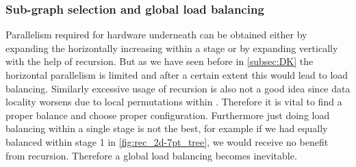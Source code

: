 \subsubsection{Sub-graph selection and global load balancing} \label{subsec:subgraph_selection}
Parallelism required for hardware underneath can be obtained either by expanding the \levelTree horizontally \ie increasing \levelGroups within a stage or by expanding \levelTree vertically with the help of recursion. But as we have seen before in \cref{subsec:DK} the horizontal parallelism is limited and after a certain extent this would lead to load balancing. Similarly excessive usage of recursion is also not a good idea since data locality worsens due to local permutations within \subgraph. Therefore it is vital to find a proper balance and choose proper configuration. Furthermore just doing load balancing within a single stage is not the best, for example if we had equally balanced within stage 1 in \cref{fig:rec_2d-7pt_tree}, we would receive no benefit from recursion. Therefore a global load balancing becomes inevitable.

